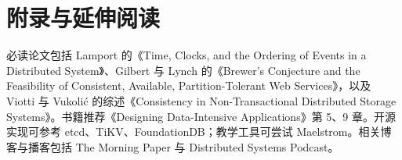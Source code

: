 \chapter{附录与延伸阅读}
必读论文包括 Lamport 的《Time, Clocks, and the Ordering of Events in a Distributed System》、Gilbert 与 Lynch 的《Brewer’s Conjecture and the Feasibility of Consistent, Available, Partition-Tolerant Web Services》，以及 Viotti 与 Vukolić 的综述《Consistency in Non-Transactional Distributed Storage Systems》。书籍推荐《Designing Data-Intensive Applications》第 5、9 章。开源实现可参考 etcd、TiKV、FoundationDB；教学工具可尝试 Maelstrom。相关博客与播客包括 The Morning Paper 与 Distributed Systems Podcast。\par
